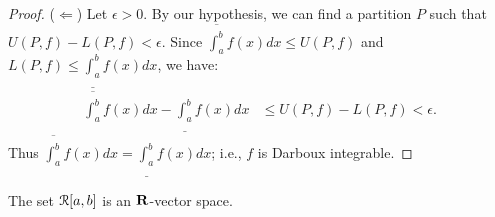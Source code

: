 \documentclass[11pt,twoside,openany]{memoir}
\begin{document}
\begin{proof}
            ($\Leftarrow$) Let $\epsilon > 0$. By our hypothesis, we can find a partition $P$ such that $U(P,f) - L(P,f) < \epsilon$. Since $\overline{\int_a^b}f(x)dx \leq U(P,f)$ and $L(P,f) \leq \underline{\int_a^b}f(x)dx$, we have:
                \begin{equation*}
                \begin{split}
                    \overline{\int_a^b}f(x)dx - \underline{\int_a^b}f(x)dx 
                    & \leq U(P,f) - L(P,f) < \epsilon.
                \end{split}
                \end{equation*}
            Thus $\overline{\int_a^b}f(x)dx = \underline{\int_a^b}f(x)dx$; i.e., $f$ is Darboux integrable. 
        \end{proof}

    \begin{proposition}\label{prop:4}
        The set $\mathcal{R}[a,b]$ is an $\mathbf{R}$-vector space.
    \end{proposition}
\end{document}
